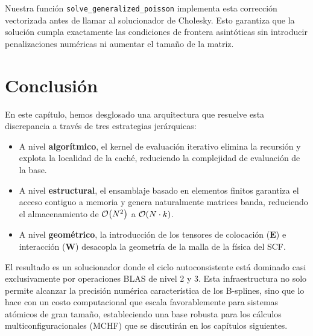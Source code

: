 \documentclass[12pt, a4paper, oneside, spanish]{article}
\begin{document}
Nuestra función \texttt{solve\_generalized\_poisson} implementa esta corrección vectorizada antes de llamar al solucionador de Cholesky. Esto garantiza que la solución cumpla exactamente las condiciones de frontera asintóticas sin introducir penalizaciones numéricas ni aumentar el tamaño de la matriz.

\section{Conclusión}

En este capítulo, hemos desglosado una arquitectura que resuelve esta discrepancia a través de tres estrategias jerárquicas:

\begin{itemize}
    \item A nivel \textbf{algorítmico}, el kernel de evaluación iterativo elimina la recursión y explota la localidad de la caché, reduciendo la complejidad de evaluación de la base.
    \item A nivel \textbf{estructural}, el ensamblaje basado en elementos finitos garantiza el acceso contiguo a memoria y genera naturalmente matrices banda, reduciendo el almacenamiento de \( \order{N^2} \) a \( \order{N \cdot k} \).
    \item A nivel \textbf{geométrico}, la introducción de los tensores de colocación (\(\bm{E}\)) e interacción (\(\mathbf{W}\)) desacopla la geometría de la malla de la física del SCF.
\end{itemize}

El resultado es un solucionador donde el ciclo autoconsistente está dominado casi exclusivamente por operaciones BLAS de nivel 2 y 3. Esta infraestructura no solo permite alcanzar la precisión numérica característica de los B-splines, sino que lo hace con un costo computacional que escala favorablemente para sistemas atómicos de gran tamaño, estableciendo una base robusta para los cálculos multiconfiguracionales (MCHF) que se discutirán en los capítulos siguientes.
\end{document}
